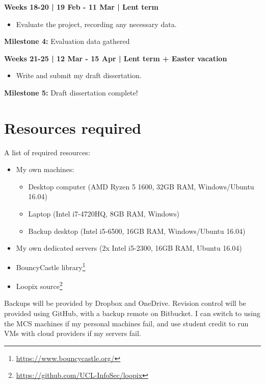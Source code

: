 \documentclass[12pt,a4paper,twoside]{article}
\begin{document}
	\textbf{Weeks 18-20 | 19 Feb - 11 Mar | Lent term}
	
	\begin{itemize}
		\item Evaluate the project, recording any necessary data.
	\end{itemize}
	
	\textbf{Milestone 4:} Evaluation data gathered
	
	\textbf{Weeks 21-25 | 12 Mar - 15 Apr | Lent term + Easter vacation}
	
	\begin{itemize}
		\item Write and submit my draft dissertation.
	\end{itemize}
	
	\textbf{Milestone 5:} Draft dissertation complete!
	
	\section*{Resources required}
	
	A list of required resources:
	
	\begin{itemize}
		\item My own machines:
		\begin{itemize}
			\item Desktop computer (AMD Ryzen 5 1600, 32GB RAM, Windows/Ubuntu 16.04)
			\item Laptop (Intel i7-4720HQ, 8GB RAM, Windows)
			\item Backup desktop (Intel i5-6500, 16GB RAM, Windows/Ubuntu 16.04)
		\end{itemize}
		\item My own dedicated servers (2x Intel i5-2300, 16GB RAM, Ubuntu 16.04)
		\item BouncyCastle library\footnote{\url{https://www.bouncycastle.org/}}
		\item Loopix source\footnote{\url{https://github.com/UCL-InfoSec/loopix}}
	\end{itemize}
	
	Backups will be provided by Dropbox and OneDrive. Revision control will be provided using GitHub, with a backup remote on Bitbucket. I can switch to using the MCS machines if my personal machines fail, and use student credit to run VMs with cloud providers if my servers fail.
	
	
	
	
\end{document}
